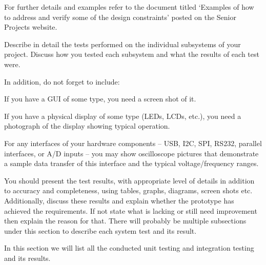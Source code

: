 \documentclass[../main.tex]{subfiles}
\begin{document}
\begin{newrequirements}
\begin{todolist}
    \item For further details and examples refer 
        to the document titled ‘Examples of how 
        to address and verify some of the 
        design constraints’ posted on the 
        Senior Projects website. 
         
    \item Describe in detail the tests performed 
        on the individual subsystems of your 
        project.  Discuss how you tested each 
        subsystem and what the results of each 
        test were. 

    \item In addition, do not forget to include: 

    \begin{todolist}
    \item If you have a GUI of some type, you 
        need a screen shot of it. 

    \item If you have a physical display of some 
        type (LEDs, LCDs, etc.), you need a 
        photograph of the display showing 
        typical operation. 

    \item For any interfaces of your hardware 
        components – USB, I2C, SPI, RS232, 
        parallel interfaces, or A/D inputs – 
        you may show oscilloscope pictures that 
        demonstrate a sample data transfer of 
        this interface and the typical 
        voltage/frequency ranges. 
    \end{todolist}

    \item [\done] You should present the test results, 
        with appropriate level of details in 
        addition to accuracy and completeness, 
        using tables, graphs, diagrams, screen 
        shots etc. Additionally, discuss these 
        results and explain whether the 
        prototype has achieved the 
        requirements. If not state what is 
        lacking or still need improvement then 
        explain the reason for that. There will 
        probably be multiple subsections under 
        this section to describe each system 
        test and its result. 

    \end{todolist}
\end{newrequirements}
In this section we will list all the conducted unit 
testing and integration testing and its results.
\end{document}
